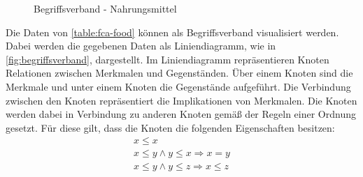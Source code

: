 \begin{figure}[!ht]
    \centering
    \caption{\label{fig:begriffsverband}Begriffsverband - Nahrungsmittel}
\end{figure}

Die Daten von \autoref{table:fca-food} können als Begriffsverband visualisiert werden.
Dabei werden die gegebenen Daten als Liniendiagramm, wie in \autoref{fig:begriffsverband}, dargestellt. %
Im Liniendiagramm repräsentieren Knoten Relationen zwischen Merkmalen und Gegenständen.
Über einem Knoten sind die Merkmale und unter einem Knoten die Gegenstände aufgeführt.
Die Verbindung zwischen den Knoten repräsentiert die Implikationen von Merkmalen.
Die Knoten werden dabei in Verbindung zu anderen Knoten gemäß der Regeln einer Ordnung gesetzt.
Für diese gilt, dass die Knoten die folgenden Eigenschaften besitzen:
\begin{align}
    x \leq x \tag{reflexiv}                                       \\
    x \leq y \land y \leq x \Rightarrow x=y \tag{antisymmetrisch} \\
    x \leq y \land y \leq z \Rightarrow x\leq z \tag{transitiv}
\end{align}

